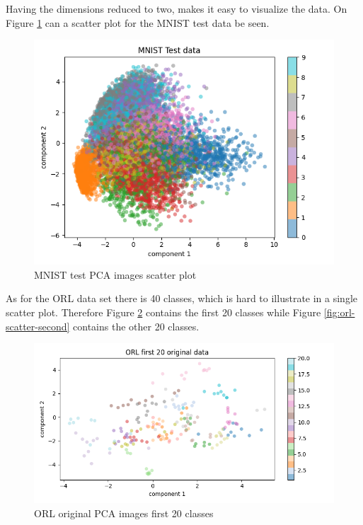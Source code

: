 Having the dimensions reduced to two, makes it easy to visualize the data. On Figure \ref{fig:mnist-scatter} can a scatter plot for the MNIST test data be seen. 

\begin{figure}[htbp]
    \centering
    \includegraphics[width=1\columnwidth]{../source/mnist/pictures/mnist-scatter.png}
    \caption{MNIST test PCA images scatter plot}
    \label{fig:mnist-scatter}
\end{figure}

As for the ORL data set there is 40 classes, which is hard to illustrate in a single scatter plot. Therefore Figure \ref{fig:orl-scatter-first} contains the first 20 classes while Figure \ref{fig:orl-scatter-second} contains the other 20 classes. 


\begin{figure}[htbp]
    \centering
    \includegraphics[width=1\columnwidth]{../source/orl/pictures/orl-scatter-original-first.png}
    \caption{ORL original PCA images first 20 classes}
    \label{fig:orl-scatter-first}
\end{figure}

